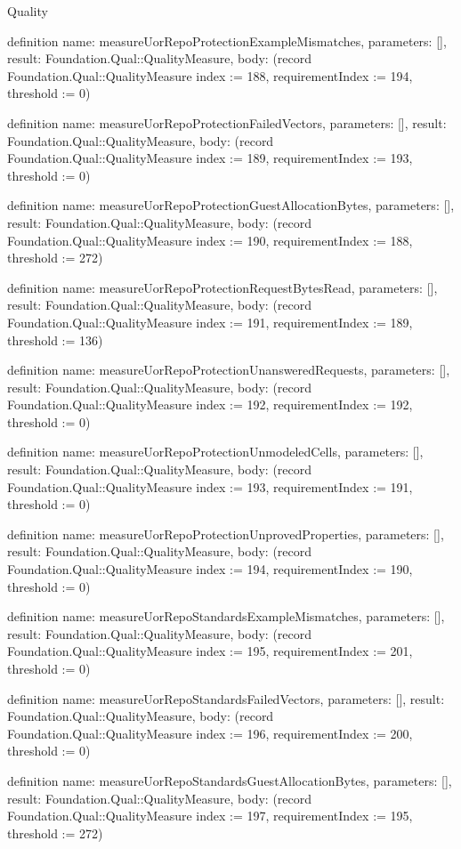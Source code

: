 \begin{lexlean}{Quality}
\begin{semanticmodule}
definition{
  name: measureUorRepoProtectionExampleMismatches,
  parameters: [],
  result: Foundation.Qual::QualityMeasure,
  body: (record Foundation.Qual::QualityMeasure {index := 188, requirementIndex := 194, threshold := 0})
}

definition{
  name: measureUorRepoProtectionFailedVectors,
  parameters: [],
  result: Foundation.Qual::QualityMeasure,
  body: (record Foundation.Qual::QualityMeasure {index := 189, requirementIndex := 193, threshold := 0})
}

definition{
  name: measureUorRepoProtectionGuestAllocationBytes,
  parameters: [],
  result: Foundation.Qual::QualityMeasure,
  body: (record Foundation.Qual::QualityMeasure {index := 190, requirementIndex := 188, threshold := 272})
}

definition{
  name: measureUorRepoProtectionRequestBytesRead,
  parameters: [],
  result: Foundation.Qual::QualityMeasure,
  body: (record Foundation.Qual::QualityMeasure {index := 191, requirementIndex := 189, threshold := 136})
}

definition{
  name: measureUorRepoProtectionUnansweredRequests,
  parameters: [],
  result: Foundation.Qual::QualityMeasure,
  body: (record Foundation.Qual::QualityMeasure {index := 192, requirementIndex := 192, threshold := 0})
}

definition{
  name: measureUorRepoProtectionUnmodeledCells,
  parameters: [],
  result: Foundation.Qual::QualityMeasure,
  body: (record Foundation.Qual::QualityMeasure {index := 193, requirementIndex := 191, threshold := 0})
}

definition{
  name: measureUorRepoProtectionUnprovedProperties,
  parameters: [],
  result: Foundation.Qual::QualityMeasure,
  body: (record Foundation.Qual::QualityMeasure {index := 194, requirementIndex := 190, threshold := 0})
}

definition{
  name: measureUorRepoStandardsExampleMismatches,
  parameters: [],
  result: Foundation.Qual::QualityMeasure,
  body: (record Foundation.Qual::QualityMeasure {index := 195, requirementIndex := 201, threshold := 0})
}

definition{
  name: measureUorRepoStandardsFailedVectors,
  parameters: [],
  result: Foundation.Qual::QualityMeasure,
  body: (record Foundation.Qual::QualityMeasure {index := 196, requirementIndex := 200, threshold := 0})
}

definition{
  name: measureUorRepoStandardsGuestAllocationBytes,
  parameters: [],
  result: Foundation.Qual::QualityMeasure,
  body: (record Foundation.Qual::QualityMeasure {index := 197, requirementIndex := 195, threshold := 272})
}


\end{semanticmodule}
\end{lexlean}
